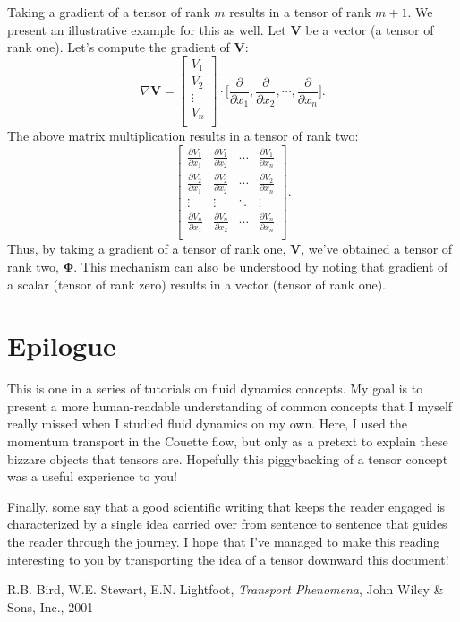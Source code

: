 \documentclass[10pt,twocolumn]{article}
\begin{document}
Taking a gradient of a tensor of rank $m$ results in a tensor of rank $m+1$. We present an illustrative example for this as well.
Let $\mathbf{V}$ be a vector (a tensor of rank one). Let's compute the gradient of $\mathbf{V}$:
\begin{equation*}
  \nabla \mathbf{V} =
  \begin{bmatrix}
  V_1 \\
  V_2 \\
  \vdots \\
  V_n \\
  \end{bmatrix}
  \cdot 
  \Big[ \frac{\partial}{\partial x_1} , \frac{\partial}{\partial x_2}, \cdots , \frac{\partial}{\partial x_n} \Big].
\end{equation*}
The above matrix multiplication results in a tensor of rank two:
\begin{equation*}
  \begin{bmatrix}
  \frac{\partial V_1}{\partial x_1} & \frac{\partial V_1}{\partial x_2} & \cdots & \frac{\partial V_1}{\partial x_n} \\
  \frac{\partial V_2}{\partial x_1} & \frac{\partial V_2}{\partial x_2} & \cdots & \frac{\partial V_2}{\partial x_n} \\
  \vdots & \vdots & \ddots & \vdots \\
  \frac{\partial V_n}{\partial x_1} & \frac{\partial V_n}{\partial x_2} & \cdots & \frac{\partial V_n}{\partial x_n} \\
  \end{bmatrix}.
\end{equation*}
Thus, by taking a gradient of a tensor of rank one, $\mathbf{V}$, we've obtained a tensor of rank two, $\pmb{\Phi}$. This mechanism can also be understood by noting that gradient of a scalar (tensor of rank zero) results in a vector (tensor of rank one).

\newpage

\section*{Epilogue}

This is one in a series of tutorials on fluid dynamics concepts. My goal is to present a more human-readable understanding of common concepts that I myself really missed when I studied fluid dynamics on my own. Here, I used the momentum transport in the Couette flow, but only as a pretext to explain these bizzare objects that tensors are. Hopefully this piggybacking of a tensor concept was a useful experience to you!

Finally, some say that a good scientific writing that keeps the reader engaged is characterized by a single idea carried over from sentence to sentence that guides the reader through the journey. I hope that I've managed to make this reading interesting to you by transporting the idea of a tensor downward this document!

\thebibliography{}

 R.B. Bird, W.E. Stewart, E.N. Lightfoot, \textit{Transport Phenomena}, John Wiley \& Sons, Inc., 2001
\end{document}

